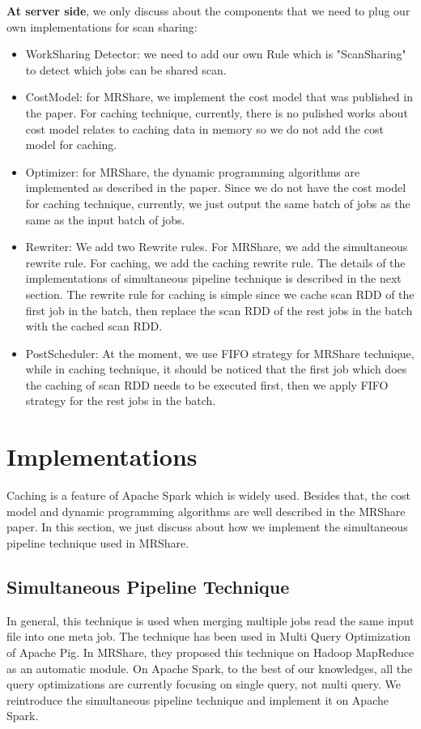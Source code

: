 \textbf{At server side}, we only discuss about the components that we need to plug our own implementations for scan sharing:
\begin{itemize}
\item WorkSharing Detector: we need to add our own Rule which is "ScanSharing" to detect which jobs can be shared scan.
\item CostModel: for MRShare, we implement the cost model that was published in the paper. For caching technique, currently, there is no pulished works about cost model relates to caching data in memory so we do not add the cost model for caching.
\item Optimizer: for MRShare, the dynamic programming algorithms are implemented as described in the paper. Since we do not have the cost model for caching technique, currently, we just output the same batch of jobs as the same as the input batch of jobs.
\item Rewriter: We add two Rewrite rules. For MRShare, we add the simultaneous rewrite rule. For caching, we add the caching rewrite rule. The details of the implementations of simultaneous pipeline technique is described in the next section. The rewrite rule for caching is simple since we cache scan RDD of the first job in the batch, then replace the scan RDD of the rest jobs in the batch with the cached scan RDD.
\item PostScheduler: At the moment, we use FIFO strategy for MRShare technique, while in caching technique, it should be noticed that the first job which does the caching of scan RDD needs to be executed first, then we apply FIFO strategy for the rest jobs in the batch.
\end{itemize} 

\section{Implementations}

Caching is a feature of Apache Spark which is widely used. Besides that, the cost model and dynamic programming algorithms are well described in the MRShare paper. In this section, we just discuss about how we implement the simultaneous pipeline technique used in MRShare.

\subsection{Simultaneous Pipeline Technique}

In general, this technique is used when merging multiple jobs read the same input file into one meta job. The technique has been used in Multi Query Optimization of Apache Pig. In MRShare, they proposed this technique on Hadoop MapReduce as an automatic module. On Apache Spark, to the best of our knowledges, all the query optimizations are currently focusing on single query, not multi query. We reintroduce the simultaneous pipeline technique and implement it on Apache Spark.

